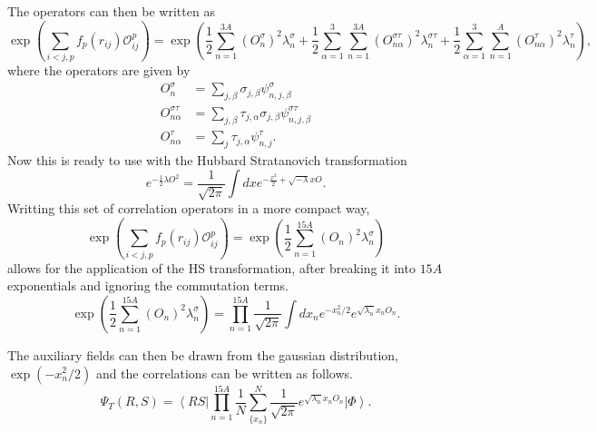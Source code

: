 \documentclass[12pt]{extarticle}
\newcommand{\Oijp}{\mathcal{O}^p_{ij}}
\newcommand{\ket}[1]{\left| #1 \right>}
\newcommand{\bra}[1]{\left< #1 \right|}
\begin{document}
The operators can then be written as
\begin{equation}
   \exp\left(\sum\limits_{i<j,p}f_p(r_{ij})\Oijp\right) = \exp\left(\frac{1}{2}\sum\limits_{n=1}^{3A} \left(O_{n}^{\sigma}\right)^2 \lambda_n^{\sigma}
      + \frac{1}{2}\sum\limits_{\alpha=1}^{3}\sum\limits_{n=1}^{3A} \left(O_{n\alpha}^{\sigma\tau}\right)^2 \lambda_n^{\sigma\tau}
      + \frac{1}{2}\sum\limits_{\alpha=1}^{3}\sum\limits_{n=1}^{A} \left(O_{n\alpha}^{\tau}\right)^2 \lambda_n^{\tau}\right),
\end{equation}
where the operators are given by
\begin{equation}
\begin{split}
   O_{n}^{\sigma} &= \sum\limits_{j,\beta} \sigma_{j,\beta}\psi_{n,j,\beta}^{\sigma} \\
   O_{n\alpha}^{\sigma\tau} &= \sum\limits_{j,\beta} \tau_{j,\alpha}\sigma_{j,\beta}\psi_{n,j,\beta}^{\sigma\tau} \\
   O_{n\alpha}^{\tau} &= \sum\limits_{j} \tau_{j,\alpha}\psi_{n,j}^{\tau}.
\end{split}
\end{equation}
Now this is ready to use with the Hubbard Stratanovich transformation
\begin{equation}
   e^{-\frac{1}{2}\lambda O^2} = \frac{1}{\sqrt{2\pi}} \int dx e^{-\frac{x^2}{2} + \sqrt{-\lambda}x O}.
\end{equation}
Writting this set of correlation operators in a more compact way,
\begin{equation}
    \exp\left(\sum\limits_{i<j,p}f_p(r_{ij})\Oijp\right) = \exp\left(\frac{1}{2}\sum\limits_{n=1}^{15A} \left(O_{n}\right)^2 \lambda_n^{\sigma}\right)
\end{equation}
allows for the application of the HS transformation, after breaking it into $15A$ exponentials and ignoring the commutation terms.
\begin{equation}
   \exp\left(\frac{1}{2}\sum\limits_{n=1}^{15A} \left(O_{n}\right)^2 \lambda_n^{\sigma}\right) = \prod\limits_{n=1}^{15A} \frac{1}{\sqrt{2\pi}}\int dx_n e^{-x_n^2/2}e^{\sqrt{\lambda_n}x_nO_n}.
\end{equation}

The auxiliary fields can then be drawn from the gaussian distribution, $\exp\left(-x_n^2/2\right)$ and the correlations can be written as follows.
\begin{equation}
   \Psi_T(R,S) = \bra{RS}\prod\limits_{n=1}^{15A} \frac{1}{N} \sum\limits_{\{x_n\}}^N\frac{1}{\sqrt{2\pi}}e^{\sqrt{\lambda_n}x_nO_n}\ket{\Phi}.
\end{equation}
\end{document}
